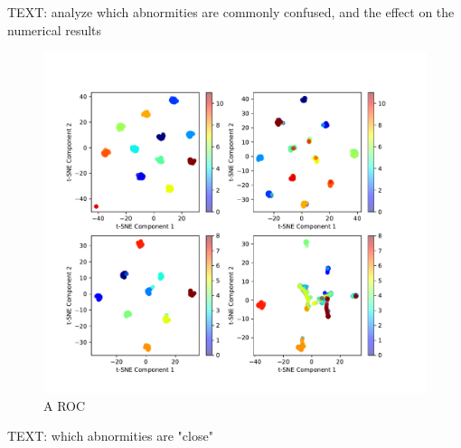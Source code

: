 \documentclass{article}
\begin{document}
			TEXT: analyze which abnormities are commonly confused, and the effect on the numerical results
			
			\begin{figure}[htbp]
				\centering
				\includegraphics[width=\linewidth]{Figs/abnormity_tSNE.pdf}
				\caption{A ROC}
				\vspace{0.3cm}
				\label{fig:A_tSNE}
			\end{figure}
			
			TEXT: which abnormities are "close"
			
\end{document}
